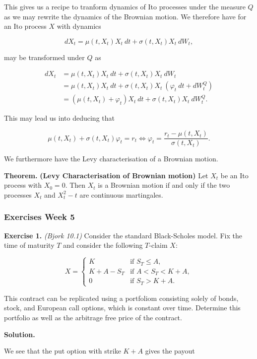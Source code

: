 \documentclass[
]{article}
\begin{document}
This gives us a recipe to tranform dynamics of Ito processes under the
measure \(Q\) as we may rewrite the dynamics of the Brownian motion. We
therefore have for an Ito process \(X\) with dynamics

\[
dX_t=\mu(t,X_t)X_t\ dt+\sigma(t,X_t) X_t\ dW_t,
\]

may be transformed under \(Q\) as

\begin{align*}
dX_t&=\mu(t,X_t)X_t\ dt+\sigma(t,X_t) X_t\ dW_t\\
&=\mu(t,X_t)X_t\ dt+\sigma(t,X_t) X_t\ (\varphi_t\ dt+dW_t^Q)\\
&=\left(\mu(t,X_t) + \varphi_t\right) X_t\ dt + \sigma(t,X_t)X_t\ dW_t^Q.
\end{align*}

This may lead us into deducing that

\[
\mu(t,X_t)+\sigma(t,X_t)\varphi_t=r_t\iff\varphi_t=\frac{r_t-\mu(t,X_t)}{\sigma(t,X_t)}.
\]

We furthermore have the Levy characterisation of a Brownian motion.

\textbf{Theorem.} \textbf{(Levy Characterisation of Brownian motion)}
Let \(X_t\) be an Ito process with \(X_0=0\). Then \(X_t\) is a Brownian
motion if and only if the two processes \(X_t\) and \(X_t^2-t\) are
continuous martingales.

\hypertarget{exercises-week-5}{%
\subsubsection{Exercises Week 5}\label{exercises-week-5}}

\textbf{Exercise 1.} \emph{(Bjork 10.1)} Consider the standard
Black-Scholes model. Fix the time of maturity \(T\) and consider the
following \(T\)-claim \(X\):

\[
X=
\begin{cases}
  K & \text{if }S_T\le A,\\
  K+A-S_T & \text{if }A<S_T<K+ A,\\
  0 & \text{if }S_T > K+ A.
\end{cases}  
\]

This contract can be replicated using a portfoliom consisting solely of
bonds, stock, and European call options, which is constant over time.
Determine this portfolio as well as the arbitrage free price of the
contract.

\textbf{Solution.}

We see that the put option with strike \(K+A\) gives the payout
\end{document}
